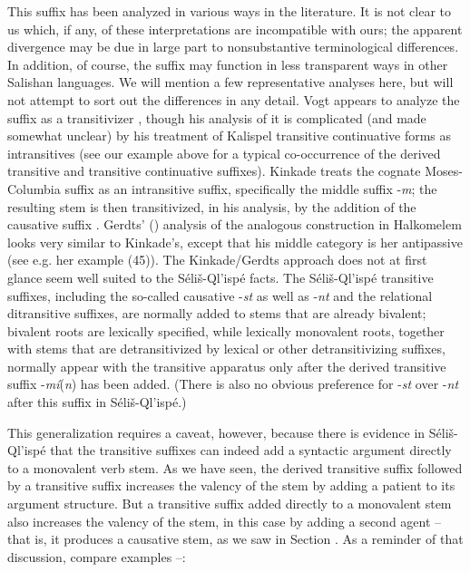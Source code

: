 \documentclass[output=paper,colorlinks,citecolor=brown]{langscibook}
\begin{document}
This suffix has been analyzed in various ways in the literature.  It
is not clear to us which, if any, of these interpretations are
incompatible with ours; the apparent divergence may be due in large
part to nonsubstantive terminological differences.  In addition, of
course, the suffix may function in less transparent ways in other
Salishan languages.  We will mention a few representative analyses
here, but will not attempt to sort out the differences in any detail.
Vogt appears to analyze the suffix as a transitivizer \citep[59--60]{Vogt:1940},
though his analysis of it is complicated (and made somewhat unclear)
by his treatment of Kalispel transitive continuative forms as
intransitives (see our example  above for a typical co-occurrence of the
derived transitive and transitive continuative suffixes).  Kinkade
treats the cognate Moses-Columbia suffix as an intransitive suffix,
specifically the middle suffix -\emph{m}; the resulting stem is then
transitivized, in his analysis, by the addition of the causative
suffix \citep[195]{Kinkade:1981}.  Gerdts' (\citeyear{Gerdts:1993}) analysis of the analogous
construction in Halkomelem looks very similar to Kinkade's, except
that his middle category is her antipassive (see e.g. her example (45)).
The Kinkade/Gerdts approach does not at first glance seem well suited
to the S\'eli\v{s}-Ql'isp\'e facts.  The S\'eli\v{s}-Ql'isp\'e
transitive suffixes, including the so-called causative -\emph{st} as
well as -\emph{nt} and the relational ditransitive suffixes, are normally
added to stems that are already bivalent; bivalent roots are
lexically specified, while lexically monovalent roots, together with
stems that are detransitivized by lexical or other detransitivizing
suffixes, normally appear with the transitive apparatus only after the
derived transitive suffix -\emph{m\'i}(\emph{n}) has been added.  (There
is also no obvious preference for -\emph{st} over -\emph{nt} after this
suffix in S\'eli\v{s}-Ql'isp\'e.)


This generalization requires a caveat, however, because there is
evidence in S\'eli\v{s}-Ql'isp\'e that the transitive suffixes can
indeed add a syntactic argument directly to a monovalent verb stem.
As we have seen, the derived transitive suffix followed by a
transitive suffix increases the valency of the stem by adding a
patient to its argument structure.  But a transitive suffix added
directly to a monovalent stem also increases the valency of the stem,
in this case by adding a second agent -- that is, it produces a
causative stem, as we saw in Section .  As a reminder of that
discussion, compare examples --:
\end{document}
